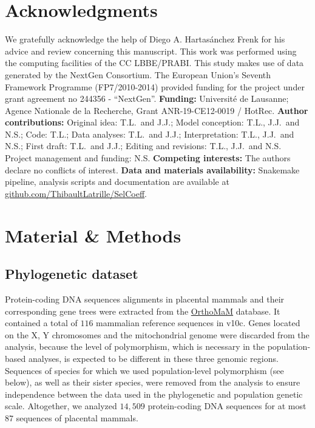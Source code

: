\documentclass{article}
\begin{document}
    \section*{Acknowledgments}
    \label{sec:acknowledgment}
    We gratefully acknowledge the help of Diego A. Hartasánchez Frenk for his advice and review concerning this manuscript.
    This work was performed using the computing facilities of the CC LBBE/PRABI\@.
    This study makes use of data generated by the NextGen Consortium.
    The European Union’s Seventh Framework Programme (FP7/2010-2014) provided funding for the project under grant agreement no 244356 - “NextGen”.
    \textbf{Funding:}
    Université de Lausanne; Agence Nationale de la Recherche, Grant ANR-19-CE12-0019 / HotRec.
    \textbf{Author contributions:}
    Original idea: T.L.\ and J.J.;
    Model conception: T.L., J.J.\ and N.S.;
    Code: T.L.;
    Data analyses: T.L.\ and J.J.;
    Interpretation: T.L., J.J.\ and N.S.;
    First draft: T.L.\ and J.J.;
    Editing and revisions: T.L., J.J.\ and N.S.
    Project management and funding: N.S\@.
    \textbf{Competing interests:}
    The authors declare no conflicts of interest.
    \textbf{Data and materials availability:}
    Snakemake pipeline, analysis scripts and documentation are available at \href{https://github.com/ThibaultLatrille/SelCoeff}{github.com/ThibaultLatrille/SelCoeff}.


    \section{Material \& Methods}
    \label{sec:methods}

    \subsection{Phylogenetic dataset}

    Protein-coding DNA sequences alignments in placental mammals and their corresponding gene trees were extracted from the \href{https://www.orthomam.univ-montp2.fr}{OrthoMaM} database.
    It contained a total of $116$ mammalian reference sequences in v10c\cite{ranwez_orthomam_2007, douzery_orthomam_2014, scornavacca_orthomam_2019}.
    Genes located on the X, Y chromosomes and the mitochondrial genome were discarded from the analysis, because the level of polymorphism, which is necessary in the population-based analyses, is expected to be different in these three genomic regions.
    Sequences of species for which we used population-level polymorphism (see below), as well as their sister species, were removed from the analysis to ensure independence between the data used in the phylogenetic and population genetic scale.
    Altogether, we analyzed $14,509$ protein-coding DNA sequences for at most $87$ sequences of placental mammals.
\end{document}
